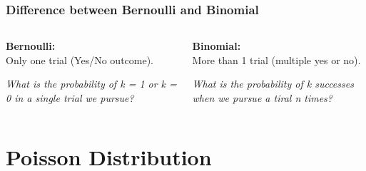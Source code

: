 \documentclass{beamer}
\begin{document}
\begin{frame}[fragile]
    \frametitle{Difference between Bernoulli and Binomial}
    \large
    \begin{columns}
        \begin{column}{0.5\textwidth}
            \textbf{Bernoulli:}\\
            Only one trial (Yes/No outcome).
            \vspace{0.2cm}
            
            \textit{What is the probability of k = 1 or k = 0 in a single trial we pursue?}
        \end{column}
        \begin{column}{0.5\textwidth}
            \textbf{Binomial:}\\
            More than 1 trial (multiple yes or no).
            \vspace{0.2cm}
            
            \textit{What is the probability of k successes when we pursue a tiral n times?}
        \end{column}
    \end{columns}
\end{frame}

\section{Poisson Distribution}
\end{document}
